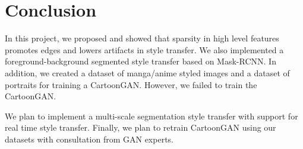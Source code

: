 \documentclass{article}
\begin{document}
\section{Conclusion}
In this project, we proposed and showed that sparsity in high level features promotes edges and lowers artifacts in style transfer. We also implemented a foreground-background segmented style transfer based on Mask-RCNN. In addition, we created a dataset of manga/anime styled images and a dataset of portraits for training a CartoonGAN.
However, we failed to train the CartoonGAN.

We plan to implement a multi-scale segmentation style transfer with support for real time style transfer.
Finally, we plan to retrain CartoonGAN using our datasets with consultation from GAN experts.


\medskip
\end{document}
